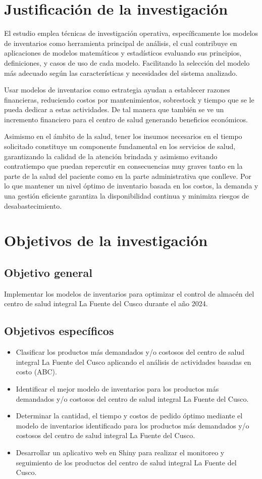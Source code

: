 \section{Justificación de la investigación}
El estudio emplea técnicas de investigación operativa, específicamente los modelos de inventarios como herramienta principal de análisis, el cual contribuye en aplicaciones de modelos matemáticos y estadísticos evaluando sus principios, definiciones, y casos de uso de cada modelo. Facilitando la selección del modelo más adecuado según las características y necesidades del sistema analizado.

Usar modelos de inventarios como estrategia ayudan a establecer razones financieras, reduciendo costos por mantenimientos, sobrestock y tiempo que se le pueda dedicar a estas actividades. De tal manera que también se ve un incremento financiero para el centro de salud generando beneficios económicos.

Asimismo en el ámbito de la salud, tener los insumos necesarios en el tiempo solicitado constituye un componente fundamental en los servicios de salud, garantizando la calidad de la atención brindada y asimismo evitando contratiempo que puedan repercutir en consecuencias muy graves tanto en la parte de la salud del paciente como en la parte administrativa que conlleve. Por lo que mantener un nivel óptimo de inventario basada en los costos, la demanda y una gestión eficiente garantiza la disponibilidad continua y minimiza riesgos de desabastecimiento.
\newpage
\section{Objetivos de la investigación}
\subsection{Objetivo general}
Implementar los modelos de inventarios para optimizar el control de almacén del centro de salud integral La Fuente del Cusco durante el año 2024.
\subsection{Objetivos específicos}
\begin{itemize}
	\item Clasificar los productos más demandados y/o costosos del centro de salud integral La Fuente del Cusco aplicando el análisis de actividades basadas en costo (ABC).
	\item Identificar el mejor modelo de inventarios para los productos más demandados y/o costosos del centro de salud integral La Fuente del Cusco.
	\item Determinar la cantidad, el tiempo y costos de pedido óptimo mediante el modelo de inventarios identificado para los productos más demandados y/o costosos del centro de salud integral La Fuente del Cusco.
	\item Desarrollar un aplicativo web en Shiny para realizar el monitoreo y seguimiento de los productos del centro de salud integral La Fuente del Cusco.
\end{itemize}

